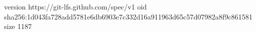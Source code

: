 version https://git-lfs.github.com/spec/v1
oid sha256:1d043fa728add5781e6db6903e7c332d16a911963d65c57d07982a8f9c861581
size 1187
